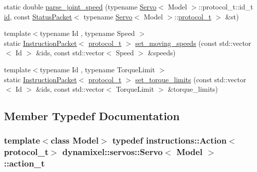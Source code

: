 \begin{DoxyCompactItemize}
static double \hyperlink{classdynamixel_1_1servos_1_1_servo_a4eeab8a43893c98df9f3cad6cdf2a6ab}{parse\+\_\+joint\+\_\+speed} (typename \hyperlink{classdynamixel_1_1servos_1_1_servo}{Servo}$<$ Model $>$\+::protocol\+\_\+t\+::id\+\_\+t \hyperlink{classdynamixel_1_1servos_1_1_servo_a2d022081672e25a7bb57b76706e1cc57}{id}, const \hyperlink{classdynamixel_1_1_status_packet}{Status\+Packet}$<$ typename \hyperlink{classdynamixel_1_1servos_1_1_servo}{Servo}$<$ Model $>$\+::\hyperlink{classdynamixel_1_1servos_1_1_servo_a7718c41cee1187b992836f4b6bad8a38}{protocol\+\_\+t} $>$ \&st)
\item 
{\footnotesize template$<$typename Id , typename Speed $>$ }\\static \hyperlink{classdynamixel_1_1_instruction_packet}{Instruction\+Packet}$<$ \hyperlink{classdynamixel_1_1servos_1_1_servo_a7718c41cee1187b992836f4b6bad8a38}{protocol\+\_\+t} $>$ \hyperlink{classdynamixel_1_1servos_1_1_servo_a8e764c4e4bdeaf3cc89b3fb7955db62c}{set\+\_\+moving\+\_\+speeds} (const std\+::vector$<$ Id $>$ \&ids, const std\+::vector$<$ Speed $>$ \&speeds)
\item 
{\footnotesize template$<$typename Id , typename Torque\+Limit $>$ }\\static \hyperlink{classdynamixel_1_1_instruction_packet}{Instruction\+Packet}$<$ \hyperlink{classdynamixel_1_1servos_1_1_servo_a7718c41cee1187b992836f4b6bad8a38}{protocol\+\_\+t} $>$ \hyperlink{classdynamixel_1_1servos_1_1_servo_ab10774b1d3d5532f19df4d535d33e369}{set\+\_\+torque\+\_\+limits} (const std\+::vector$<$ Id $>$ \&ids, const std\+::vector$<$ Torque\+Limit $>$ \&torque\+\_\+limits)
\end{DoxyCompactItemize}


\subsection{Member Typedef Documentation}
\subsubsection[{\texorpdfstring{action\+\_\+t}{action_t}}]{\setlength{\rightskip}{0pt plus 5cm}template$<$class Model$>$ typedef {\bf instructions\+::\+Action}$<${\bf protocol\+\_\+t}$>$ {\bf dynamixel\+::servos\+::\+Servo}$<$ Model $>$\+::{\bf action\+\_\+t}}\hypertarget{classdynamixel_1_1servos_1_1_servo_ad4d14ab8f1ea33479dce5fc2c7790ded}{}\label{classdynamixel_1_1servos_1_1_servo_ad4d14ab8f1ea33479dce5fc2c7790ded}
